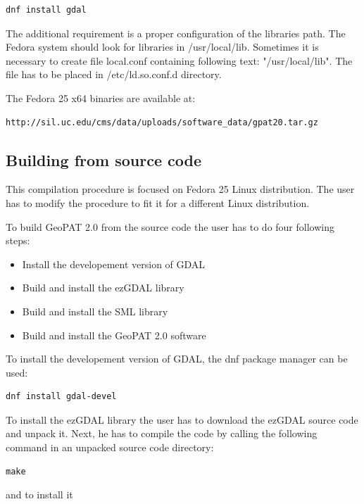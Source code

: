 \documentclass[12pt,margin=0.5in]{article}
\begin{document}
\begin{appendices}
\begin{lstlisting}
dnf install gdal
\end{lstlisting}

The additional requirement is a proper configuration of the libraries path.
The Fedora system should look for libraries in /usr/local/lib.
Sometimes it is necessary to create file local.conf containing following
text: "/usr/local/lib".
The file has to be placed in /etc/ld.so.conf.d directory.

The Fedora 25 x64 binaries are available at:

\begin{lstlisting}[frame=single]
http://sil.uc.edu/cms/data/uploads/software_data/gpat20.tar.gz
\end{lstlisting}

\subsection{Building from source code}

This compilation procedure is focused on Fedora 25
Linux distribution. The user has to modify the procedure
to fit it for a different Linux distribution.

To build GeoPAT 2.0 from the source code the user has to do four following steps:

\begin{itemize}
    \item{Install the developement version of GDAL}
    \item{Build and install the ezGDAL library}
    \item{Build and install the SML library}
    \item{Build and install the GeoPAT 2.0 software}
\end{itemize}

To install the developement version of GDAL, the dnf package manager can be used:

\begin{lstlisting}
dnf install gdal-devel
\end{lstlisting}

To install the ezGDAL library the user has to download the ezGDAL source
code and unpack it. Next, he has to compile the code by calling the following
command in an unpacked source code directory:

\begin{lstlisting}
make
\end{lstlisting}

and to install it


\end{appendices}
\end{document}
